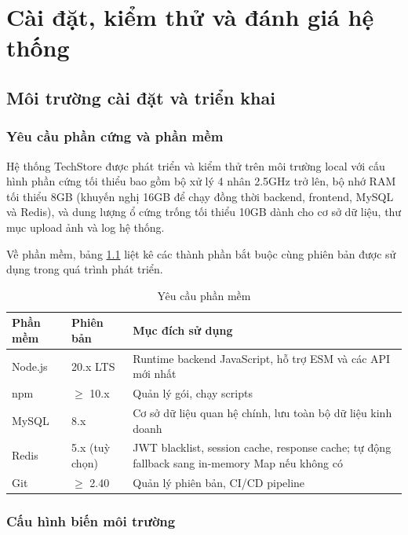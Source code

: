 \chapter{Cài đặt, kiểm thử và đánh giá hệ thống}

\section{Môi trường cài đặt và triển khai}

\subsection{Yêu cầu phần cứng và phần mềm}

Hệ thống TechStore được phát triển và kiểm thử trên môi trường local với cấu hình phần cứng tối thiểu bao gồm bộ xử lý 4 nhân 2.5GHz trở lên, bộ nhớ RAM tối thiểu 8GB (khuyến nghị 16GB để chạy đồng thời backend, frontend, MySQL và Redis), và dung lượng ổ cứng trống tối thiểu 10GB dành cho cơ sở dữ liệu, thư mục upload ảnh và log hệ thống.

Về phần mềm, bảng \ref{tab:software-req} liệt kê các thành phần bắt buộc cùng phiên bản được sử dụng trong quá trình phát triển.

\begin{table}[H]
\centering
\caption{Yêu cầu phần mềm}
\label{tab:software-req}
\begin{tabular}{|l|l|p{7cm}|}
\hline
\textbf{Phần mềm} & \textbf{Phiên bản} & \textbf{Mục đích sử dụng} \\
\hline
Node.js & 20.x LTS & Runtime backend JavaScript, hỗ trợ ESM và các API mới nhất \\
\hline
npm & $\geq$ 10.x & Quản lý gói, chạy scripts \\
\hline
MySQL & 8.x & Cơ sở dữ liệu quan hệ chính, lưu toàn bộ dữ liệu kinh doanh \\
\hline
Redis & 5.x (tuỳ chọn) & JWT blacklist, session cache, response cache; tự động fallback sang in-memory Map nếu không có \\
\hline
Git & $\geq$ 2.40 & Quản lý phiên bản, CI/CD pipeline \\
\hline
\end{tabular}
\end{table}

\subsection{Cấu hình biến môi trường}

